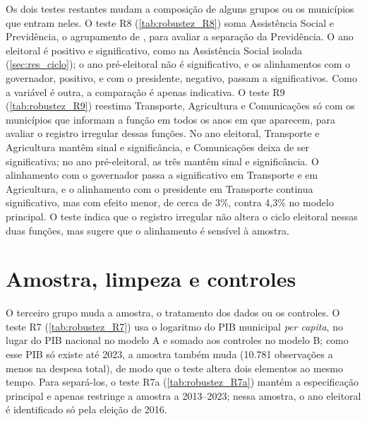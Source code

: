 Os dois testes restantes mudam a composição de alguns grupos ou os municípios que entram neles. O teste R8 (\autoref{tab:robustez_R8}) soma Assistência Social e Previdência, o agrupamento de \textcite{sakurai2009}, para avaliar a separação da Previdência. O ano eleitoral é positivo e significativo, como na Assistência Social isolada (\autoref{sec:res_ciclo}); o ano pré-eleitoral não é significativo, e os alinhamentos com o governador, positivo, e com o presidente, negativo, passam a significativos. Como a variável é outra, a comparação é apenas indicativa. O teste R9 (\autoref{tab:robustez_R9}) reestima Transporte, Agricultura e Comunicações só com os municípios que informam a função em todos os anos em que aparecem, para avaliar o registro irregular dessas funções. No ano eleitoral, Transporte e Agricultura mantêm sinal e significância, e Comunicações deixa de ser significativa; no ano pré-eleitoral, as três mantêm sinal e significância. O alinhamento com o governador passa a significativo em Transporte e em Agricultura, e o alinhamento com o presidente em Transporte continua significativo, mas com efeito menor, de cerca de 3\%, contra 4,3\% no modelo principal. O teste indica que o registro irregular não altera o ciclo eleitoral nessas duas funções, mas sugere que o alinhamento é sensível à amostra.


\section{Amostra, limpeza e controles}

O terceiro grupo muda a amostra, o tratamento dos dados ou os controles. O teste R7 (\autoref{tab:robustez_R7}) usa o logaritmo do PIB municipal \textit{per capita}, no lugar do PIB nacional no modelo A e somado aos controles no modelo B; como esse PIB só existe até 2023, a amostra também muda (10.781 observações a menos na despesa total), de modo que o teste altera dois elementos ao mesmo tempo. Para separá-los, o teste R7a (\autoref{tab:robustez_R7a}) mantém a especificação principal e apenas restringe a amostra a 2013--2023; nessa amostra, o ano eleitoral é identificado só pela eleição de 2016.

